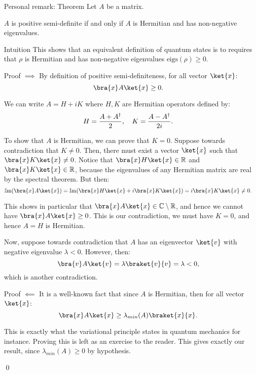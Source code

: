 \documentclass[a4paper]{article}
\begin{document}
\begin{parag}{Personal remark: Theorem}
    Let $A$ be a matrix.

    $A$ is positive semi-definite if and only if $A$ is Hermitian and has non-negative eigenvalues.

    \begin{subparag}{Intuition}
        This shows that an equivalent definition of quantum states is to requires that $\rho$ is Hermitian and has non-negative eigenvalues $\text{eigs}\left(\rho\right) \geq 0$.
    \end{subparag}

    \begin{subparag}{Proof $\implies$}
        By definition of positive semi-definiteness, for all vector $\ket{x}$: 
        \[\bra{x} A \ket{x} \geq 0.\]

        We can write $A = H + iK$ where $H, K$ are Hermitian operators defined by: 
        \[H = \frac{A + A^{\dagger}}{2}, \quad K = \frac{A - A^{\dagger}}{2i}.\]

        To show that $A$ is Hermitian, we can prove that $K = 0$. Suppose towards contradiction that $K \neq 0$. Then, there must exist a vector $\ket{x}$ such that $\bra{x} K \ket{x} \neq 0$. Notice that $\bra{x} H \ket{x} \in \mathbb{R}$ and $\bra{x} K \ket{x} \in \mathbb{R}$, because the eigenvalues of any Hermitian matrix are real by the spectral theorem. But then: 
        \[\cim\left(\bra{x} A \ket{x}\right) = \cim\left(\bra{x} H \ket{x} + i \bra{x} K \ket{x}\right) = i \bra{x} K \ket{x} \neq 0.\]
        
        This shows in particular that $\bra{x} A \ket{x} \in \mathbb{C} \setminus \mathbb{R}$, and hence we cannot have $\bra{x} A \ket{x} \geq 0$. This is our contradiction, we must have $K = 0$, and hence $A = H$ is Hermitian.

        Now, suppose towards contradiction that $A$ has an eigenvector $\ket{v}$ with negative eigenvalue $\lambda < 0$. However, then: 
        \[\bra{v} A \ket{v} = \lambda \braket{v}{v} = \lambda < 0,\]
        which is another contradiction.
    \end{subparag}

    \begin{subparag}{Proof $\impliedby$}
        It is a well-known fact that since $A$ is Hermitian, then for all vector $\ket{x}$: 
        \[\bra{x} A \ket{x} \geq \lambda_{min}\left(A\right) \braket{x}{x}.\]
        
        This is exactly what the variational principle states in quantum mechanics for instance. Proving this is left as an exercise to the reader. This gives exactly our result, since $\lambda_{min}\left(A\right) \geq 0$ by hypothesis.

        \qed
    \end{subparag}
\end{parag}
\end{document}

